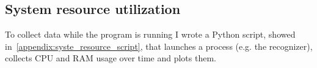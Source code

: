 \documentclass[../thesis.tex]{subfiles}
\begin{document}
\subsection{System resource utilization}\label{ss:system_resource_utilization}
To collect data while the program is running I wrote a Python script, showed in~\ref{appendix:syste_resource_script}, that launches a process (e.g. the recognizer), collects CPU and RAM usage over time and plots them.
\end{document}

